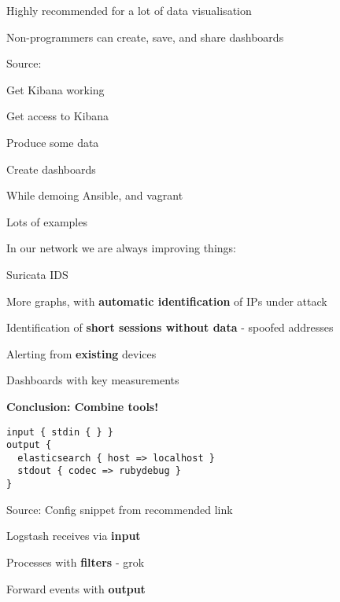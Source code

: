 \documentclass[20pt,landscape,a4paper,footrule]{foils}
\begin{document}
\centerline{Highly recommended for a lot of data visualisation}

Non-programmers can create, save, and share dashboards

Source:



\begin{list2}
\item Get Kibana working
\item Get access to Kibana
\item Produce some data
\item Create dashboards
\end{list2}

While demoing Ansible, and vagrant

Lots of examples\\



In our network we are always improving things:
\begin{list1}
\item Suricata IDS 
\item More graphs, with {\bf automatic identification} of IPs under attack
\item Identification of {\bf short sessions without data} - spoofed addresses
\item Alerting from {\bf existing} devices
\item Dashboards with key measurements
\end{list1}

\vskip 2cm
\centerline{\bf\Large Conclusion: Combine tools!}



\begin{verbatim}
input { stdin { } }
output {
  elasticsearch { host => localhost }
  stdout { codec => rubydebug }
}
\end{verbatim}


Source:
Config snippet from recommended link\\
{\small{}}

\begin{list2}
\item Logstash receives via {\bf input}
\item Processes with {\bf filters} - grok
\item Forward events with {\bf output}
\end{list2}
\end{document}
